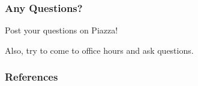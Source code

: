 \documentclass[t]{beamer}
\begin{document}
    \begin{frame}
        \frametitle{Any Questions?}
        Post your questions on Piazza!

        \bigskip
        Also, try to come to office hours and ask questions.
    \end{frame}




    \begin{frame}
        \frametitle{References}
        \printbibliography
    \end{frame}
\end{document}
